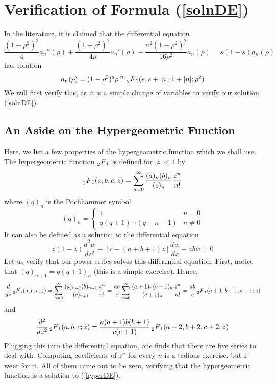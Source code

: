 \documentclass[]{article}
\begin{document}
\section*{Verification of Formula (\ref{solnDE})}

In the literature, it is claimed that the differential equation
\begin{equation}\label{litDE}
\frac{(1-\rho^2)^2}{4}a_n''(\rho) + \frac{(1-\rho^2)^2}{4\rho}a_n'(\rho) - \frac{n^2(1-\rho^2)^2}{16\rho^2}a_n(\rho) = s(1-s)a_n(\rho)
\end{equation}
has solution
\begin{equation}\label{litSoln}
	a_n(\rho) = (1 - \rho^2)^s\rho^{|n|}\prescript{}{2}{F}_1(s, s+|n|, 1+|n|; \rho^2)
\end{equation}
We will first verify this, as it is a simple change of variables to verify our solution (\ref{solnDE}).

\subsection*{An Aside on the Hypergeometric Function}

Here, we list a few properties of the hypergeometric function which we shall use.
The hypergeometric function $\prescript{}{2}{F}_1$ is defined for $|z| < 1$ by
$$
\prescript{}{2}{F}_1(a, b, c; z) = \sum_{n=0}^{\infty}\frac{(a)_n(b)_n}{(c)_n}\frac{z^n}{n!}
$$
where $(q)_n$ is the Pochhammer symbol
\[
(q)_n =
\begin{cases}
1 & n = 0 \\
q(q+1)\cdots(q+n-1) & n \neq 0
\end{cases}
\]
It can also be defined as a solution to the differential equation
\begin{equation}\label{hyperDE}
z(1-z)\frac{d^2 w}{dz^2} + [c - (a+b+1)z]\frac{dw}{dz} - abw = 0
\end{equation}
Let us verify that our power series solves this differential equation.
First, notice that $(q)_{n+1} = q(q+1)_n$ (this is a simple exercise).
Hence,
$$
\frac{d}{dz}\prescript{}{2}{F}_1(a, b, c; z) =
\sum_{n=0}^{\infty}\frac{(a)_{n+1}(b)_{n+1}}{(c)_{n+1}}\frac{z^n}{n!} =
\frac{ab}{c}\sum_{n=0}^{\infty}\frac{(a+1)_n(b+1)_n}{(c+1)_n}\frac{z^n}{n!} =
\frac{ab}{c}\prescript{}{2}{F}_1(a+1, b+1, c+1; z)
$$
and
$$
\frac{d^2}{dz^2}\prescript{}{2}{F}_1(a, b, c; z) =
\frac{a(a+1)b(b+1)}{c(c+1)}\prescript{}{2}{F}_1(a+2, b+2, c+2; z)
$$
Plugging this into the differential equation, one finds that there are five series to deal with.
Computing coefficients of $z^n$ for every $n$ is a tedious exercise, but I went for it.
All of them came out to be zero, verifying that the hypergeometric function is a solution to (\ref{hyperDE}).
\end{document}
